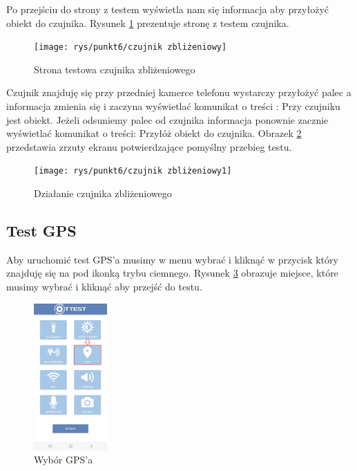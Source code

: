 Po przejściu do strony z testem wyświetla nam się informacja aby przyłożyć obiekt do czujnika.
\newline
Rysunek \ref{rys:czujnik zbliżeniowy} prezentuje stronę z testem czujnika. 

\begin{figure}[!hbt]
	\begin{center}
		\texttt{[image: rys/punkt6/czujnik zbliżeniowy]}
		\caption{Strona testowa czujnika zbliżeniowego}
		\label{rys:czujnik zbliżeniowy}
	\end{center}
\end{figure}

Czujnik znajduję się przy przedniej kamerce telefonu wystarczy przyłożyć palec a informacja zmienia się i zaczyna wyświetlać komunikat o treści : Przy czujniku jest obiekt. Jeżeli odsuniemy palec od czujnika informacja ponownie zacznie wyświetlać komunikat o treści: Przyłóż obiekt do czujnika.
\newline
Obrazek \ref{rys:czujnik zbliżeniowy1} przedstawia zrzuty ekranu potwierdzające pomyślny przebieg testu.

\begin{figure}[!hbt]
	\begin{center}
		\texttt{[image: rys/punkt6/czujnik zbliżeniowy1]}
		\caption{Działanie czujnika zbliżeniowego}
		\label{rys:czujnik zbliżeniowy1}
	\end{center}
\end{figure}

\newpage


\subsection{Test GPS}

Aby uruchomić test GPS'a musimy w menu wybrać i kliknąć w przycisk który znajduję się na pod ikonką trybu ciemnego. 
\newline
Rysunek \ref{rys:menu4} obrazuje miejsce, które musimy wybrać i kliknąć aby przejść do testu.

\begin{figure}[!hbt]
	\begin{center}
		\includegraphics[angle=360, width=0.25\textwidth]{rys/punkt6/menu4}
		\caption{Wybór GPS'a}
		\label{rys:menu4}
	\end{center}
\end{figure}

